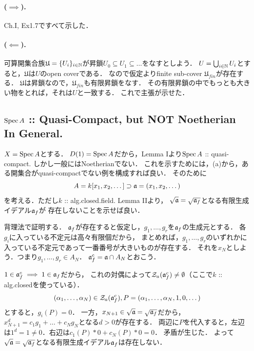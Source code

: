 \documentclass[a4paper]{jsarticle}
\begin{document}
    \paragraph{($\implies$).}
    Ch.I, Ex1.7ですべて示した．

    \paragraph{($\impliedby$).}
    可算開集合族$\mathfrak{U}=\{U_i\}_{i \in \mathbb{N}}$が昇鎖$U_0 \subseteq U_1 \subseteq \dots$をなすとしよう．
    $U=\bigcup_{i \in \mathbb{N}} U_i$とすると，$\mathfrak{U}$は$U$のopen coverである．
    なので仮定よりfinite sub-cover $\mathfrak{U}_{fin}$が存在する．
    $\mathfrak{U}$は昇鎖なので，$\mathfrak{U}_{fin}$も有限昇鎖をなす．
    その有限昇鎖の中でもっとも大きい物をとれば，それは$U$と一致する．
    これで主張が示せた．

    \subsection{$\operatorname{Spec} A$ :: Quasi-Compact, but NOT Noetherian In General.}
    $X=\operatorname{Spec} A$とする．
    $D(1)=\operatorname{Spec} A$だから，Lemma Iより$\operatorname{Spec} A$ :: quasi-compact.
    しかし一般にはNoetherianでない．
    これを示すためには，(a)から，ある開集合がquasi-compactでない例を構成すれば良い．
    そのために
    \[ A=k[x_1,x_2,\dots] \supset \mathfrak{a}=(x_1,x_2,\dots) \]
    を考える．ただし$k$ :: alg.closed.field.
    Lemma IIより，
    $\sqrt{\mathfrak{a}}=\sqrt{\mathfrak{a}_f}$となる有限生成イデアル$\mathfrak{a}_f$が
    存在しないことを示せば良い．

    背理法で証明する．
    $\mathfrak{a}_f$が存在すると仮定し，$g_1,\dots,g_r$を$\mathfrak{a}_f$の生成元とする．
    各$g_i$に入っている不定元は高々有限個だから，
    まとめれば，$g_1,\dots,g_r$のいずれかに入っている不定元であって一番番号が大きいものが存在する．
    それを$x_N$としよう．つまり$g_1,\dots,g_r \in A_N$．
    $\mathfrak{a}_f^c=\mathfrak{a} \cap A_N$とおこう．

    $1 \in \mathfrak{a}_f^c \implies 1 \in \mathfrak{a}_f$だから，
    これの対偶によって$\mathcal{Z}_a(\mathfrak{a}_f^c) \neq \emptyset$（ここで$k$ :: alg.closedを使っている）．
    \[ (\alpha_1,\dots,\alpha_N) \in \mathcal{Z}_a(\mathfrak{a}_f^c), P=(\alpha_1,\dots,\alpha_N,1,0,\dots) \]
    とすると，$g_i(P)=0$．
    一方，$x_{N+1} \in \sqrt{\mathfrak{a}}=\sqrt{\mathfrak{a}_f}$だから，
    $x_{N+1}^d=c_1g_1+\dots+c_Ng_N$となる$d>0$が存在する．
    両辺に$P$を代入すると，左辺は$1^d=1 \neq 0$．右辺は$c_1(P)*0+c_N(P)*0=0$．
    矛盾が生じた．
    よって$\sqrt{\mathfrak{a}}=\sqrt{\mathfrak{a}_f}$となる有限生成イデアル$\mathfrak{a}_f$は存在しない．
\end{document}
